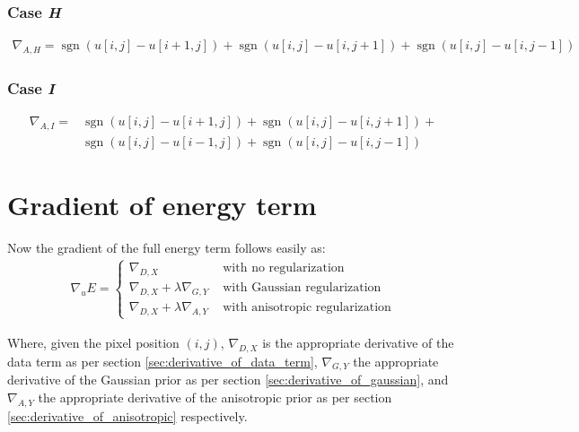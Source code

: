 \documentclass[a4paper]{scrreprt}
\DeclareMathOperator{\sgn}{sgn}
\begin{document}
\subsubsection{Case \emph{H}}

\begin{align*}
		\nabla_{A, H} =
		  \sgn(u[i, j] - u[i + 1, j]) + \sgn(u[i, j] - u[i, j + 1]) + \sgn(u[i, j] - u[i, j -1])
\end{align*}

\subsubsection{Case \emph{I}}

\begin{align*}
		\nabla_{A, I} =
		  & \sgn(u[i, j] - u[i + 1, j]) + \sgn(u[i, j] - u[i, j + 1]) + \\
		  & \sgn(u[i, j] - u[i - 1, j]) + \sgn(u[i, j] - u[i, j - 1])
\end{align*}


\section{Gradient of energy term}

Now the gradient of the full energy term follows easily as:
\begin{align*}
		\nabla_u E = 
		\begin{cases}
				\nabla_{D, X} & \text{ with no regularization} \\
				\nabla_{D, X} + \lambda \nabla_{G, Y} & \text{ with Gaussian regularization} \\
				\nabla_{D, X} + \lambda \nabla_{A, Y} & \text{ with anisotropic regularization}
		\end{cases}
\end{align*}

Where, given the pixel position $(i, j)$, $\nabla_{D, X}$ is the appropriate
derivative of the data term as per section \ref{sec:derivative_of_data_term},
$\nabla_{G, Y}$ the appropriate derivative of the Gaussian prior as per section
\ref{sec:derivative_of_gaussian}, and $\nabla_{A, Y}$ the appropriate
derivative of the anisotropic prior as per section
\ref{sec:derivative_of_anisotropic} respectively.

\printbibliography
\end{document}

